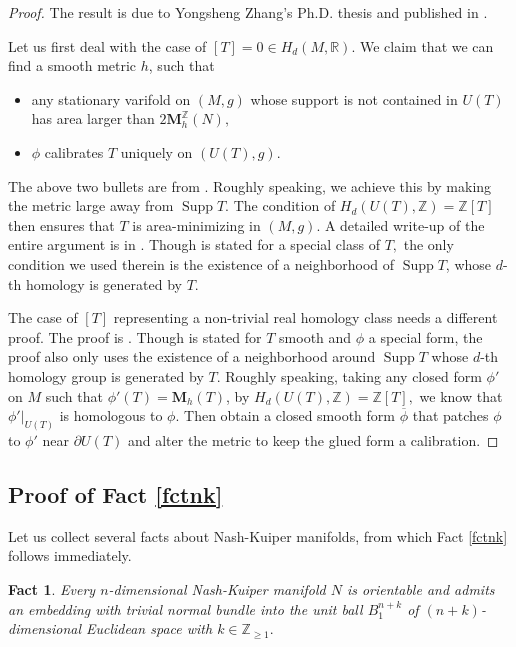 \documentclass[11pt,a4paper]{amsart}
\numberwithin{equation}{section}
\newcommand{\supp}{\operatorname{Supp}}
\newcommand{\ms}{\mathbf{M}}
\newcommand{\ov}[1]{\overline{#1}}
\newcommand{\pd}{\partial}
\newcommand{\R}{\mathbb{R}}
\newcommand{\Z}{\mathbb{Z}}
\theoremstyle{plain}
\newtheorem{fact}[exam]{Fact}
\theoremstyle{definition}
\numberwithin{equation}{subsection}
\begin{document}
	\begin{proof}
		The result is due to Yongsheng Zhang's Ph.D. thesis \cite{YZt} and published in \cite{YZj,YZa}. 
		
		Let us first deal with the case of $[T]=0\in H_d(M,\R).$ We claim that we can find a smooth metric $h$, such that
		\begin{itemize}
			\item any stationary varifold on $(M,g)$ whose support is not contained in $U(T)$ has area larger than $2 \ms_h^{\Z}(N),$
			\item $\phi$ calibrates $T$ uniquely on $(U(T),g).$
		\end{itemize}
		The above two bullets are from \cite[Section 3,4]{YZa}. Roughly speaking, we achieve this by making the metric large away from $\supp T.$ The condition of $H_d(U(T),\Z)=\Z[T]$ then ensures that $T$ is area-minimizing in $(M,g)$.
		A detailed write-up of the entire argument is in \cite[Section 6.4.7-6.4.8]{ZLns}. Though \cite[Section 6.4.7-6.4.8]{ZLns} is stated for a special class of $T,$ the only condition we used therein is the existence of a neighborhood of $\supp T $, whose $d$-th homology is generated by $T.$
		
		The case of $[T]$ representing a non-trivial real homology class needs a different proof. The proof is \cite[Section 3.3]{YZa}. Though \cite[Section 3.3]{YZa} is stated for $T$ smooth and $\phi$ a special form, the proof also only uses the existence of a neighborhood around $\supp T$ whose $d$-th homology group is generated by $T$. Roughly speaking, taking any closed form $\phi'$ on $M$ such that $\phi'(T)=\ms_h(T)$, by $H_d(U(T),\Z)=\Z[T],$ we know that $\phi'|_{U(T)}$ is homologous to $\phi.$ Then obtain a closed smooth form $\ov{\phi}$ that patches $\phi$ to $\phi'$ near $\pd U(T)$ and alter the metric to keep the glued form a calibration.
	\end{proof}\subsection{Proof of Fact \ref{fctnk}}\label{secnk}
	Let us collect several facts about Nash-Kuiper manifolds, from which Fact \ref{fctnk} follows immediately.
	\begin{fact}\label{fctnknb}
		Every $n$-dimensional Nash-Kuiper manifold $N$ is orientable and admits an embedding with trivial normal bundle into the unit ball $B^{n+k}_1$ of $(n+k)$-dimensional Euclidean space with $k\in \Z_{\ge 1}.$
	\end{fact}
\end{document}

